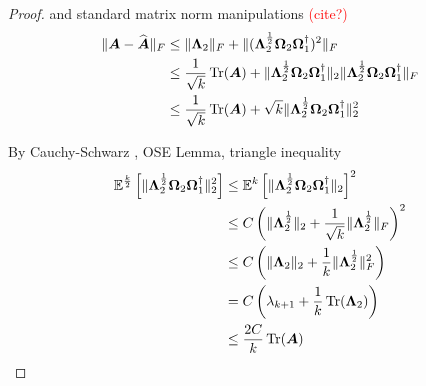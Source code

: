 \documentclass[12pt]{article}
\begin{document}
\begin{proof}
    \cite[Theorem B.1]{persson-2023-randomized-lowrank} and standard matrix norm manipulations \textcolor{red}{(cite?)}
    \begin{align}
        \lVert \boldsymbol{A} - \widehat{\boldsymbol{A}} \rVert _F 
        &\leq  \lVert \boldsymbol{\Lambda}_2 \rVert _F + \lVert (\boldsymbol{\Lambda}_2^{\frac{1}{2}} \boldsymbol{\Omega}_2 \boldsymbol{\Omega}_1^{\dagger} )^2 \rVert _F \notag \\
        &\leq \frac{1}{\sqrt{k}} \operatorname{Tr}(\boldsymbol{A}) + \lVert \boldsymbol{\Lambda}_2^{\frac{1}{2}} \boldsymbol{\Omega}_2 \boldsymbol{\Omega}_1^{\dagger} \rVert _2 \lVert \boldsymbol{\Lambda}_2^{\frac{1}{2}} \boldsymbol{\Omega}_2 \boldsymbol{\Omega}_1^{\dagger} \rVert _F \notag \\
        &\leq \frac{1}{\sqrt{k}} \operatorname{Tr}(\boldsymbol{A}) + \sqrt{k} \lVert \boldsymbol{\Lambda}_2^{\frac{1}{2}} \boldsymbol{\Omega}_2 \boldsymbol{\Omega}_1^{\dagger} \rVert _2^2 
    \end{align}

    By Cauchy-Schwarz \cite{},
    OSE Lemma, triangle inequality
    \begin{align}
        \mathbb{E}^{\frac{k}{2}}\left[ \lVert \boldsymbol{\Lambda}_2^{\frac{1}{2}} \boldsymbol{\Omega}_2 \boldsymbol{\Omega}_1^{\dagger} \rVert _2^2 \right]
        &\leq \mathbb{E}^{k}\left[ \lVert \boldsymbol{\Lambda}_2^{\frac{1}{2}} \boldsymbol{\Omega}_2 \boldsymbol{\Omega}_1^{\dagger} \rVert _2 \right]^2 \notag \\
        &\leq C \left( \lVert \boldsymbol{\Lambda}_2^{\frac{1}{2}} \rVert _2 + \frac{1}{\sqrt{k}}\lVert \boldsymbol{\Lambda}_2^{\frac{1}{2}} \rVert _F \right)^2 \notag \\
        &\leq C \left( \lVert \boldsymbol{\Lambda}_2 \rVert _2  + \frac{1}{k}\lVert \boldsymbol{\Lambda}_2^{\frac{1}{2}} \rVert _F^2 \right) \notag \\
        &= C \left( \lambda_{k+1} + \frac{1}{k}\operatorname{Tr}(\boldsymbol{\Lambda}_2) \right) \notag \\
        &\leq \frac{2 C}{k} \operatorname{Tr}(\boldsymbol{A})
    \end{align}


\end{proof}
\end{document}

